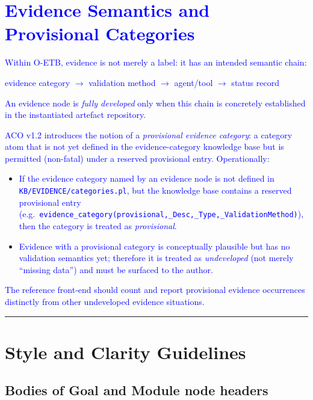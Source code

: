 \documentclass[11pt,twoside,a4paper]{article}
\begin{document}
\section{\textcolor{blue}{Evidence Semantics and Provisional Categories}}

\textcolor{blue}{Within O-ETB, evidence is not merely a label: it has an intended semantic chain:}

\begin{center}
\textcolor{blue}{evidence category $\rightarrow$ validation method $\rightarrow$ agent/tool $\rightarrow$ status record}
\end{center}

\textcolor{blue}{An evidence node is \emph{fully developed} only when this chain is concretely established in the instantiated artefact repository.}

\textcolor{blue}{ACO v1.2 introduces the notion of a \emph{provisional evidence category}: a category atom that is not yet defined in the evidence-category knowledge base but is permitted (non-fatal) under a reserved provisional entry. Operationally:}
\begin{itemize}[leftmargin=2em]
  \item \textcolor{blue}{If the evidence category named by an evidence node is not defined in \texttt{KB/\allowbreak EVIDENCE/\allowbreak categories.pl}, but the knowledge base contains a reserved provisional entry (e.g.\ \texttt{evidence\_category(provisional,\_Desc,\allowbreak\_Type,\allowbreak\_ValidationMethod)}), then the category is treated as \emph{provisional}.}
  \item \textcolor{blue}{Evidence with a provisional category is conceptually plausible but has no validation semantics yet; therefore it is treated as \emph{undeveloped} (not merely ``missing data'') and must be surfaced to the author.}
\end{itemize}

\textcolor{blue}{The reference front-end should count and report provisional evidence occurrences distinctly from other undeveloped evidence situations.}



\bigskip
\hrule
\bigskip

\section{Style and Clarity Guidelines}

\subsection{Bodies of Goal and Module node headers}
\end{document}
